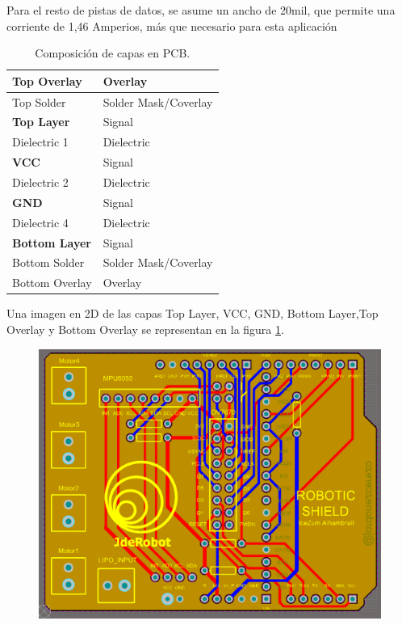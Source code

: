 Para el resto de pistas de datos, se asume un ancho de 20mil, que permite una corriente de 1,46 Amperios, más que necesario para esta aplicación


\renewcommand\tablename{Tabla}
\begin{table}[H]
	\centering
	
	\begin{tabular}{|l|l|}
		\hline
		Top Overlay           & Overlay              \\ \hline
		Top Solder            & Solder Mask/Coverlay \\ \hline
		\textbf{Top Layer}    & Signal               \\ \hline
		Dielectric 1          & Dielectric           \\ \hline
		\textbf{VCC}          & Signal               \\ \hline
		Dielectric 2          & Dielectric           \\ \hline
		\textbf{GND}          & Signal               \\ \hline
		Dielectric 4          & Dielectric           \\ \hline
		\textbf{Bottom Layer} & Signal               \\ \hline
		Bottom Solder         & Solder Mask/Coverlay \\ \hline
		Bottom Overlay        & Overlay              \\ \hline
	\end{tabular}
	\caption{Composición de capas en PCB.}
	\label{tabla:layers_altium}
\end{table}



Una imagen en 2D de las capas Top Layer, VCC, GND, Bottom Layer,Top Overlay y Bottom Overlay se representan en la figura \ref{fig:layers_altium}.


\begin{center}
	\begin{figure}[H]
		\center
		\includegraphics[scale=0.8, angle=90]{imagenes/Balancing_Robot/layers_altium.PNG}
		\caption{}
		\label{fig:layers_altium}
	\end{figure}
\end{center}



